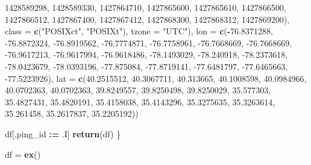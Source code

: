 \documentclass[]{article}
\newenvironment{Shaded}{\begin{snugshade}}{\end{snugshade}}
\newcommand{\DataTypeTok}[1]{\textcolor[rgb]{0.13,0.29,0.53}{#1}}
\newcommand{\DecValTok}[1]{\textcolor[rgb]{0.00,0.00,0.81}{#1}}
\newcommand{\ErrorTok}[1]{\textcolor[rgb]{0.64,0.00,0.00}{\textbf{#1}}}
\newcommand{\FloatTok}[1]{\textcolor[rgb]{0.00,0.00,0.81}{#1}}
\newcommand{\KeywordTok}[1]{\textcolor[rgb]{0.13,0.29,0.53}{\textbf{#1}}}
\newcommand{\NormalTok}[1]{#1}
\newcommand{\OperatorTok}[1]{\textcolor[rgb]{0.81,0.36,0.00}{\textbf{#1}}}
\newcommand{\StringTok}[1]{\textcolor[rgb]{0.31,0.60,0.02}{#1}}
\begin{document}
\begin{Shaded}
\begin{Highlighting}[]
    \DecValTok{1428589298}\NormalTok{, }\DecValTok{1428589330}\NormalTok{, }\DecValTok{1427864710}\NormalTok{, }\DecValTok{1427865600}\NormalTok{, }\DecValTok{1427865610}\NormalTok{, }
    \DecValTok{1427866500}\NormalTok{, }\DecValTok{1427866512}\NormalTok{, }\DecValTok{1427867400}\NormalTok{, }\DecValTok{1427867412}\NormalTok{, }\DecValTok{1427868300}\NormalTok{, }
    \DecValTok{1427868312}\NormalTok{, }\DecValTok{1427869200}\NormalTok{), }\DataTypeTok{class =} \KeywordTok{c}\NormalTok{(}\StringTok{"POSIXct"}\NormalTok{, }\StringTok{"POSIXt"}\NormalTok{), }\DataTypeTok{tzone =} \StringTok{"UTC"}\NormalTok{), }
    \DataTypeTok{lon =} \KeywordTok{c}\NormalTok{(}\OperatorTok{-}\FloatTok{76.8371288}\NormalTok{, }\FloatTok{-76.8872324}\NormalTok{, }\FloatTok{-76.8919562}\NormalTok{, }\FloatTok{-76.7774871}\NormalTok{, }
    \FloatTok{-76.7758961}\NormalTok{, }\FloatTok{-76.7668669}\NormalTok{, }\FloatTok{-76.7668669}\NormalTok{, }\FloatTok{-76.9617213}\NormalTok{, }\FloatTok{-76.9617994}\NormalTok{, }
    \FloatTok{-76.9618486}\NormalTok{, }\FloatTok{-78.1493029}\NormalTok{, }\FloatTok{-78.240918}\NormalTok{, }\FloatTok{-78.2373618}\NormalTok{, }\FloatTok{-78.0423679}\NormalTok{, }
    \FloatTok{-78.0393196}\NormalTok{, }\FloatTok{-77.875084}\NormalTok{, }\FloatTok{-77.8719141}\NormalTok{, }\FloatTok{-77.6481797}\NormalTok{, }\FloatTok{-77.6465663}\NormalTok{, }
    \FloatTok{-77.5223926}\NormalTok{), }\DataTypeTok{lat =} \KeywordTok{c}\NormalTok{(}\FloatTok{40.2515512}\NormalTok{, }\FloatTok{40.3067711}\NormalTok{, }\FloatTok{40.313665}\NormalTok{, }
    \FloatTok{40.1008598}\NormalTok{, }\FloatTok{40.0984966}\NormalTok{, }\FloatTok{40.0702363}\NormalTok{, }\FloatTok{40.0702363}\NormalTok{, }\FloatTok{39.8249557}\NormalTok{, }
    \FloatTok{39.8250498}\NormalTok{, }\FloatTok{39.8250029}\NormalTok{, }\FloatTok{35.577303}\NormalTok{, }\FloatTok{35.4827431}\NormalTok{, }\FloatTok{35.4820191}\NormalTok{, }
    \FloatTok{35.4158038}\NormalTok{, }\FloatTok{35.4143296}\NormalTok{, }\FloatTok{35.3275635}\NormalTok{, }\FloatTok{35.3263614}\NormalTok{, }\FloatTok{35.261458}\NormalTok{, }
    \FloatTok{35.2617837}\NormalTok{, }\FloatTok{35.2205192}\NormalTok{))}
  
\NormalTok{  df[,ping_id }\OperatorTok{:}\ErrorTok{=}\StringTok{ }\NormalTok{.I]}
  \KeywordTok{return}\NormalTok{(df)}
\NormalTok{\}}

\NormalTok{df =}\StringTok{ }\KeywordTok{ex}\NormalTok{()}
\end{Highlighting}
\end{Shaded}
\end{document}
